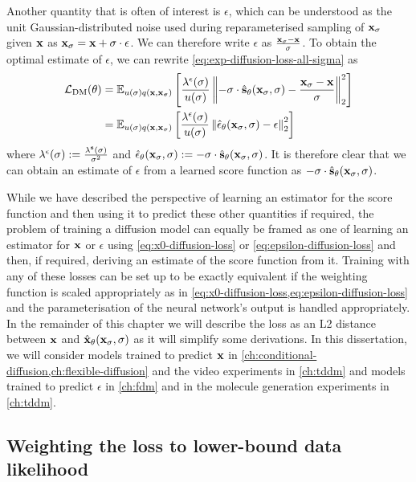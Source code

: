 Another quantity that is often of interest is $\epsilon$, which can be understood as the unit Gaussian-distributed noise used during reparameterised sampling of ${\mathbf{x}}_\sigma$ given ${\mathbf{x}}$ as ${\mathbf{x}}_\sigma = {\mathbf{x}} + \sigma \cdot \epsilon$. We can therefore write $\epsilon$ as $\frac{{\mathbf{x}}_\sigma-{\mathbf{x}}}{\sigma}$. To obtain the optimal estimate of $\epsilon$, we can rewrite \cref{eq:exp-diffusion-loss-all-sigma} as
\begin{align} \label{eq:epsilon-diffusion-loss}
    \mathcal{L}_\text{DM}(\theta) &= \mathbb{E}_{u(\sigma)q({\mathbf{x}}, {\mathbf{x}}_\sigma)} \left[ 
    \frac{\lambda^\epsilon(\sigma)}{u(\sigma)} \left\| -\sigma \cdot \hat{{\mathbf{s}}}_\theta({\mathbf{x}}_\sigma, \sigma) - \frac{{\mathbf{x}}_\sigma-{\mathbf{x}}}{\sigma} \right\|_2^2 \right] \\
    &= \mathbb{E}_{u(\sigma)q({\mathbf{x}}, {\mathbf{x}}_\sigma)} \left[ 
    \frac{\lambda^\epsilon(\sigma)}{u(\sigma)} \left\| \hat{\mathbf{\epsilon}}_\theta({\mathbf{x}}_\sigma, \sigma) - \epsilon \right\|_2^2 \right]
\end{align}
where $\lambda^\epsilon(\sigma) := \frac{\lambda^{\mathbf{s}}(\sigma)}{\sigma^2}$ and $\hat{\mathbf{\epsilon}}_\theta({\mathbf{x}}_\sigma, \sigma) := -\sigma \cdot \hat{{\mathbf{s}}}_\theta({\mathbf{x}}_\sigma, \sigma)$. It is therefore clear that we can obtain an estimate of $\epsilon$ from a learned score function as $-\sigma \cdot \hat{{\mathbf{s}}}_\theta({\mathbf{x}}_\sigma, \sigma)$.

While we have described the perspective of learning an estimator for the score function and then using it to predict these other quantities if required, the problem of training a diffusion model can equally be framed as one of learning an estimator for ${\mathbf{x}}$ or $\epsilon$ using \cref{eq:x0-diffusion-loss} or \cref{eq:epsilon-diffusion-loss} and then, if required, deriving an estimate of the score function from it. Training with any of these losses can be set up to be exactly equivalent if the weighting function is scaled appropriately as in \cref{eq:x0-diffusion-loss,eq:epsilon-diffusion-loss} and the parameterisation of the neural network's output is handled appropriately. In the remainder of this chapter we will describe the loss as an L2 distance between ${\mathbf{x}}$ and $\hat{{\mathbf{x}}}_\theta({\mathbf{x}}_\sigma, \sigma)$ as it will simplify some derivations. In this dissertation, we will consider models trained to predict ${\mathbf{x}}$ in \cref{ch:conditional-diffusion,ch:flexible-diffusion} and the video experiments in \cref{ch:tddm} and models trained to predict $\epsilon$ in \cref{ch:fdm} and in the molecule generation experiments in \cref{ch:tddm}.

\subsection{Weighting the loss to lower-bound data likelihood} \label{sec:diffusion-likelihood}


